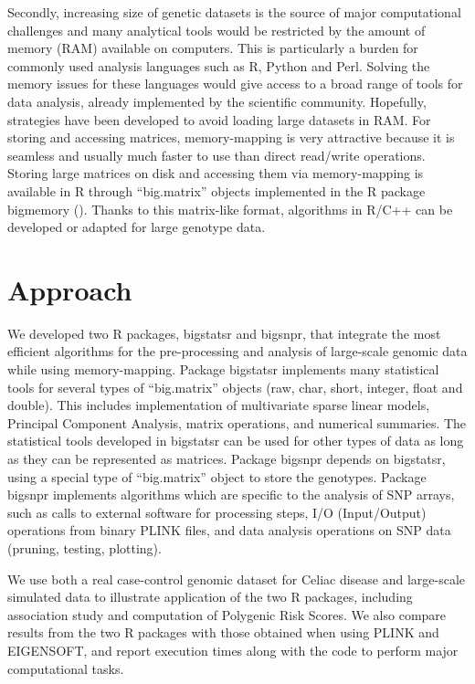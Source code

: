 \documentclass{bioinfo}
\begin{document}
Secondly, increasing size of genetic datasets is the source of major computational challenges and many analytical tools would be restricted by the amount of memory (RAM) available on computers. This is particularly a burden for commonly used analysis languages such as R, Python and Perl. Solving the memory issues for these languages would give access to a broad range of tools for data analysis, already implemented by the scientific community. Hopefully, strategies have been developed to avoid loading large datasets in RAM. For storing and accessing matrices, memory-mapping is very attractive because it is seamless and usually much faster to use than direct read/write operations. Storing large matrices on disk and accessing them via memory-mapping is available in R through ``big.matrix'' objects implemented in the R package bigmemory (\cite{Kane2013}). Thanks to this matrix-like format, algorithms in R/C++ can be developed or adapted for large genotype data. 


\section{Approach}

We developed two R packages, bigstatsr and bigsnpr, that integrate the most efficient algorithms for the pre-processing and analysis of large-scale genomic data while using memory-mapping. Package bigstatsr implements many statistical tools for several types of ``big.matrix'' objects (raw, char, short, integer, float and double). This includes implementation of multivariate sparse linear models, Principal Component Analysis, matrix operations, and numerical summaries. The statistical tools developed in bigstatsr can be used for other types of data as long as they can be represented as matrices. Package bigsnpr depends on bigstatsr, using a special type of ``big.matrix'' object to store the genotypes. Package bigsnpr implements algorithms which are specific to the analysis of SNP arrays, such as calls to external software for processing steps, I/O (Input/Output) operations from binary PLINK files, and data analysis operations on SNP data (pruning, testing, plotting). 


We use both a real case-control genomic dataset for Celiac disease and large-scale simulated data to illustrate application of the two R packages, including association study and computation of Polygenic Risk Scores. We also compare results from the two R packages with those obtained when using PLINK and EIGENSOFT, and report execution times along with the code to perform major computational tasks.
\end{document}
